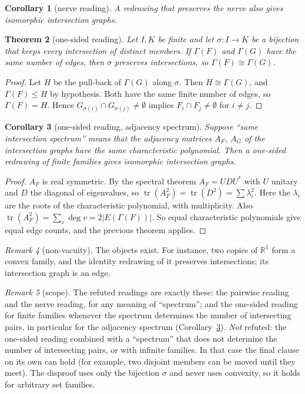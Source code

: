 \documentclass[11pt]{article}
\newtheorem{theorem}{Theorem}
\newtheorem{corollary}[theorem]{Corollary}
\theoremstyle{definition}
\theoremstyle{remark}
\newtheorem{remark}[theorem]{Remark}
\renewcommand{\_}{\oldus\allowbreak}
\begin{document}
\begin{corollary}[nerve reading]
A redrawing that preserves the nerve also gives isomorphic intersection graphs.
\end{corollary}

\begin{theorem}[one-sided reading]
Let $I,K$ be finite and let $\sigma\colon I\to K$ be a bijection that keeps every intersection of
distinct members. If $\Gamma(F)$ and $\Gamma(G)$ have the same number of edges, then $\sigma$
preserves intersections, so $\Gamma(F)\cong\Gamma(G)$.
\end{theorem}
\begin{proof}
Let $H$ be the pull-back of $\Gamma(G)$ along $\sigma$. Then $H \cong \Gamma(G)$, and
$\Gamma(F)\le H$ by hypothesis. Both have the same finite number of edges, so $\Gamma(F)=H$. Hence
$G_{\sigma(i)}\cap G_{\sigma(j)}\neq\emptyset$ implies $F_i\cap F_j\neq\emptyset$ for $i\neq j$.
\end{proof}

\begin{corollary}[one-sided reading, adjacency spectrum]\label{cor:adj}
Suppose ``same intersection spectrum'' means that the adjacency matrices $A_F$, $A_G$ of the
intersection graphs have the same characteristic polynomial. Then a one-sided redrawing of finite
families gives isomorphic intersection graphs.
\end{corollary}
\begin{proof}
$A_F$ is real symmetric. By the spectral theorem $A_F=UDU^{*}$ with $U$ unitary and $D$ the
diagonal of eigenvalues, so $\operatorname{tr}(A_F^2)=\operatorname{tr}(D^2)=\sum\lambda_i^2$. Here
the $\lambda_i$ are the roots of the characteristic polynomial, with multiplicity. Also
$\operatorname{tr}(A_F^2)=\sum_v\deg v=2|E(\Gamma(F))|$. So equal characteristic polynomials give
equal edge counts, and the previous theorem applies.
\end{proof}

\begin{remark}[non-vacuity]
The objects exist. For instance, two copies of $\mathbb{R}^1$ form a convex family, and the identity
redrawing of it preserves intersections; its intersection graph is an edge.
\end{remark}

\begin{remark}[scope]
The refuted readings are exactly these: the pairwise reading and the nerve reading, for any
meaning of ``spectrum''; and the one-sided reading for finite families whenever the spectrum
determines the number of intersecting pairs, in particular for the adjacency spectrum
(Corollary~\ref{cor:adj}). \emph{Not} refuted: the one-sided reading combined with a ``spectrum''
that does not determine the number of intersecting pairs, or with infinite families. In that case
the final clause on its own can hold (for example, two disjoint members can be moved until they
meet). The disproof uses only the bijection $\sigma$ and never uses
convexity, so it holds for arbitrary set families.
\end{remark}
\end{document}
